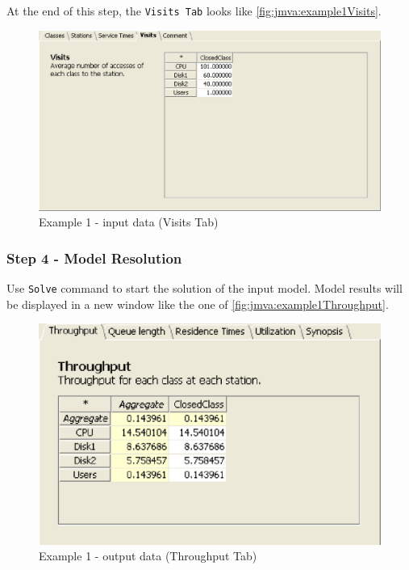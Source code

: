 At the end of this step, the \texttt{Visits Tab} looks like
\autoref{fig:jmva:example1Visits}.

\begin{figure}[htbp]
    \begin{center}
        \includegraphics[scale=.5]{img/jmva/example1Visits}
    \end{center}
    \caption{Example 1 - input data (Visits Tab)}
    \label{fig:jmva:example1Visits}
\end{figure}

\subsubsection{Step 4 - Model Resolution}

Use \texttt{Solve} command to start the solution of the input model.
Model results will be displayed in a new window like the one of
\autoref{fig:jmva:example1Throughput}.

\begin{figure}[htbp]
    \begin{center}
        \includegraphics[scale=.5]{img/jmva/example1throughput}
    \end{center}
    \caption{Example 1 - output data (Throughput Tab)}
    \label{fig:jmva:example1Throughput}
\end{figure}

